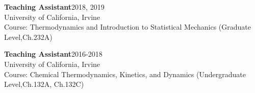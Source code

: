 \documentclass[letterpaper]{article}
\renewenvironment{itemize}{
  \begin{list}{}{
    \setlength{\leftmargin}{1.5em}
  }
}{
  \end{list}
}
\begin{document}
\begin{itemize}
\item \textbf{Teaching Assistant}\hfill 2018, 2019\\
      University of California, Irvine\\
		  Course: Thermodynamics and Introduction to Statistical Mechanics
      (Graduate Level,Ch.232A)


\item \textbf{Teaching Assistant}\hfill 2016-2018\\
      University of California, Irvine\\
		  Course: Chemical Thermodynamics, Kinetics, and Dynamics
      (Undergraduate Level,Ch.132A, Ch.132C)




\end{itemize}
\end{document}
